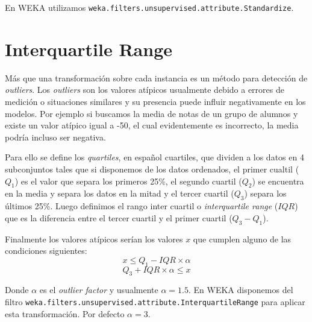 \documentclass[10pt,a4paper]{article}
\begin{document}
En WEKA utilizamos \lstinline{weka.filters.unsupervised.attribute.Standardize}.

\section{Interquartile Range}
Más que una transformación sobre cada instancia es un método para detección de \textit{outliers}. Los \textit{outliers} son los valores atípicos usualmente debido a errores de medición o situaciones similares y su presencia puede influir negativamente en los modelos. Por ejemplo si buscamos la media de notas de un grupo de alumnos y existe un valor atípico igual a -50, el cual evidentemente es incorrecto, la media podría incluso ser negativa.

Para ello se define los \textit{quartiles}, en español cuartiles, que dividen a los datos en 4 subconjuntos tales que si disponemos de los datos ordenados, el primer cualtil ($Q_1$) es el valor que separa los primeros 25\%, el segundo cuartil ($Q_2$) se encuentra en la media y separa los datos en la mitad y el tercer cuartil ($Q_3$) separa los últimos 25\%. Luego definimos el rango inter cuartil o \textit{interquartile range} ($IQR$) que es la diferencia entre el tercer cuartil y el primer cuartil ($Q_3 - Q_1$).

Finalmente los valores atípicos serían los valores $x$ que cumplen alguno de las condiciones siguientes:
\[
x \leq Q_1 - IQR \times \alpha
\]
\[
Q_3 + IQR \times \alpha \leq x
\]

Donde $\alpha$ es el \textit{outlier factor} y usualmente $\alpha=1.5$. En WEKA disponemos del filtro \lstinline{weka.filters.unsupervised.attribute.InterquartileRange} para aplicar esta transformación. Por defecto $\alpha=3$.
\end{document}
